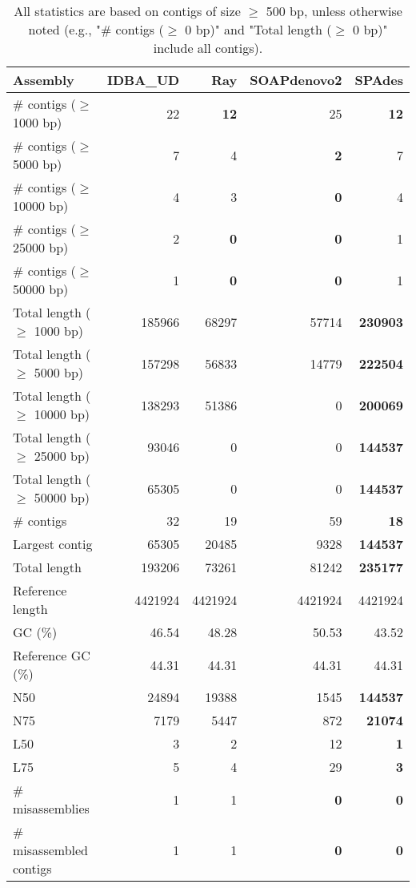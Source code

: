 \documentclass[12pt,a4paper]{article}
\begin{document}
\begin{table}[ht]
\begin{center}
\caption{All statistics are based on contigs of size $\geq$ 500 bp, unless otherwise noted (e.g., "\# contigs ($\geq$ 0 bp)" and "Total length ($\geq$ 0 bp)" include all contigs).}
\begin{tabular}{|l*{4}{|r}|}
\hline
Assembly & IDBA\_UD & Ray & SOAPdenovo2 & SPAdes \\ \hline
\# contigs ($\geq$ 1000 bp) & 22 & {\bf 12} & 25 & {\bf 12} \\ \hline
\# contigs ($\geq$ 5000 bp) & 7 & 4 & {\bf 2} & 7 \\ \hline
\# contigs ($\geq$ 10000 bp) & 4 & 3 & {\bf 0} & 4 \\ \hline
\# contigs ($\geq$ 25000 bp) & 2 & {\bf 0} & {\bf 0} & 1 \\ \hline
\# contigs ($\geq$ 50000 bp) & 1 & {\bf 0} & {\bf 0} & 1 \\ \hline
Total length ($\geq$ 1000 bp) & 185966 & 68297 & 57714 & {\bf 230903} \\ \hline
Total length ($\geq$ 5000 bp) & 157298 & 56833 & 14779 & {\bf 222504} \\ \hline
Total length ($\geq$ 10000 bp) & 138293 & 51386 & 0 & {\bf 200069} \\ \hline
Total length ($\geq$ 25000 bp) & 93046 & 0 & 0 & {\bf 144537} \\ \hline
Total length ($\geq$ 50000 bp) & 65305 & 0 & 0 & {\bf 144537} \\ \hline
\# contigs & 32 & 19 & 59 & {\bf 18} \\ \hline
Largest contig & 65305 & 20485 & 9328 & {\bf 144537} \\ \hline
Total length & 193206 & 73261 & 81242 & {\bf 235177} \\ \hline
Reference length & 4421924 & 4421924 & 4421924 & 4421924 \\ \hline
GC (\%) & 46.54 & 48.28 & 50.53 & 43.52 \\ \hline
Reference GC (\%) & 44.31 & 44.31 & 44.31 & 44.31 \\ \hline
N50 & 24894 & 19388 & 1545 & {\bf 144537} \\ \hline
N75 & 7179 & 5447 & 872 & {\bf 21074} \\ \hline
L50 & 3 & 2 & 12 & {\bf 1} \\ \hline
L75 & 5 & 4 & 29 & {\bf 3} \\ \hline
\# misassemblies & 1 & 1 & {\bf 0} & {\bf 0} \\ \hline
\# misassembled contigs & 1 & 1 & {\bf 0} & {\bf 0} \\ \hline

\end{tabular}
\end{center}
\end{table}
\end{document}
